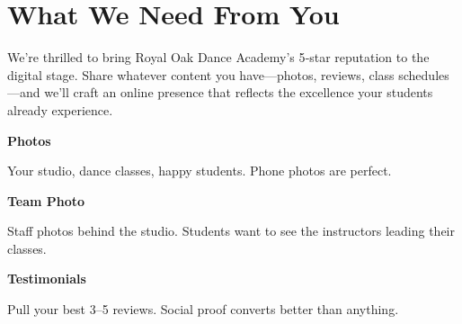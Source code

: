 \documentclass[11pt,letterpaper]{article}
\begin{document}
\vspace{0.2em}

\section*{What We Need From You}

We’re thrilled to bring Royal Oak Dance Academy’s 5‑star reputation to the digital stage. Share whatever content you have—photos, reviews, class schedules—and we’ll craft an online presence that reflects the excellence your students already experience.

\vspace{0.12em}

\noindent\begin{minipage}[t]{0.48\textwidth}
\begin{tcolorbox}[colframe=accent-teal, boxrule=1pt, left=0.7em, right=0.7em, top=0.5em, bottom=0.5em, arc=4pt, boxsep=0pt]
{\bfseries\small\color{accent-teal}Photos}

\vspace{0.15em}

{\small Your studio, dance classes, happy students. Phone photos are perfect.}
\end{tcolorbox}

\vspace{0.1em}

\begin{tcolorbox}[colframe=accent-teal, boxrule=1pt, left=0.7em, right=0.7em, top=0.5em, bottom=0.5em, arc=4pt, boxsep=0pt]
{\bfseries\small\color{accent-teal}Team Photo}

\vspace{0.15em}

{\small Staff photos behind the studio. Students want to see the instructors leading their classes.}
\end{tcolorbox}

\vspace{0.1em}

\begin{tcolorbox}[colframe=accent-teal, boxrule=1pt, left=0.7em, right=0.7em, top=0.5em, bottom=0.5em, arc=4pt, boxsep=0pt]
{\bfseries\small\color{accent-teal}Testimonials}

\vspace{0.15em}

{\small Pull your best 3--5 reviews. Social proof converts better than anything.}
\end{tcolorbox}
\end{minipage}
\end{document}
